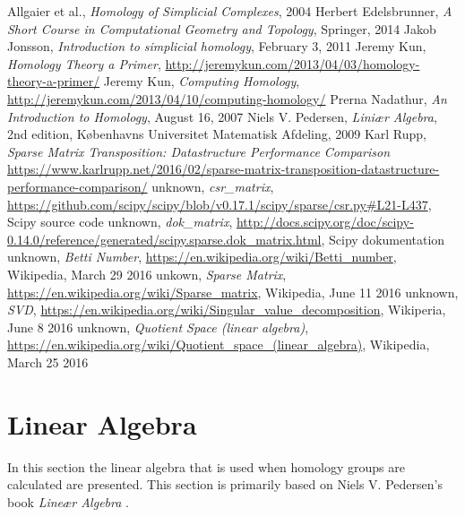 \documentclass[11pt,a4paper,twoside]{report}
\begin{document}
\begin{thebibliography}{9}

 Allgaier et al., \emph{Homology of Simplicial Complexes}, 2004
Herbert Edelsbrunner, \emph{A Short Course in Computational Geometry and Topology}, Springer, 2014
 Jakob Jonsson, \emph{Introduction to simplicial homology}, February 3, 2011
 Jeremy Kun, \emph{Homology Theory a Primer}, \url{http://jeremykun.com/2013/04/03/homology-theory-a-primer/}
 Jeremy Kun, \emph{Computing Homology}, \url{http://jeremykun.com/2013/04/10/computing-homology/}
 Prerna Nadathur, \emph{An Introduction to Homology}, August 16, 2007
 Niels V. Pedersen, \emph{Liniær Algebra}, 2nd edition, Københavns Universitet Matematisk Afdeling, 2009
 Karl Rupp, \emph{Sparse Matrix Transposition: Datastructure Performance Comparison} \url{https://www.karlrupp.net/2016/02/sparse-matrix-transposition-datastructure-performance-comparison/}
 unknown, \emph{csr\_matrix}, \url{https://github.com/scipy/scipy/blob/v0.17.1/scipy/sparse/csr.py#L21-L437}, Scipy source code
 unknown, \emph{dok\_matrix}, \url{http://docs.scipy.org/doc/scipy-0.14.0/reference/generated/scipy.sparse.dok_matrix.html}, Scipy dokumentation
 unknown, \emph{Betti Number}, \url{https://en.wikipedia.org/wiki/Betti_number}, Wikipedia, March 29 2016
 unkown, \emph{Sparse Matrix}, \url{https://en.wikipedia.org/wiki/Sparse_matrix}, Wikipedia, June 11 2016
 unknown, \emph{SVD}, \url{https://en.wikipedia.org/wiki/Singular_value_decomposition}, Wikiperia, June 8 2016
 unknown, \emph{Quotient Space (linear algebra)}, \url{https://en.wikipedia.org/wiki/Quotient_space_(linear_algebra)}, Wikipedia, March 25 2016
\end{thebibliography}
\newpage\null\newpage
\appendix
\chapter{Linear Algebra}\label{ch:linalg}
In this section the linear algebra that is used when homology groups are calculated are presented. This section is primarily based on Niels V. Pedersen's book \emph{Lineær Algebra} \cite{LinAlg}.
\end{document}
